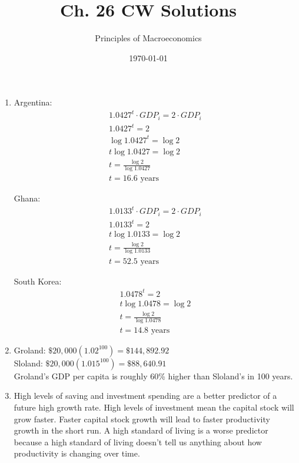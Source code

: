 \documentclass{article}
\title{Ch. 26 CW Solutions}
\author{Principles of Macroeconomics}
\date{\today}
\begin{document}
\maketitle

\begin{enumerate}

\item Argentina:
	\begin{gather*}
	1.0427^t \cdot GDP_i = 2 \cdot GDP_i \\
	1.0427^t = 2 \\
	\log{1.0427^t} = \log{2} \\
	t\log{1.0427} = \log{2} \\
	t = \frac{\log{2}}{\log{1.0427}} \\
	t = 16.6 \text{ years}
	\end{gather*}
	
	Ghana:
	\begin{gather*}
	1.0133^t \cdot GDP_i = 2 \cdot GDP_i \\
	1.0133^t = 2 \\
	t \log{1.0133} = \log{2} \\
	t = \frac{\log{2}}{\log{1.0133}} \\
	t = 52.5 \text{ years}
	\end{gather*}
	
	South Korea:
	\begin{gather*}
	1.0478^t = 2 \\
	t \log{1.0478} = \log{2} \\
	t = \frac{\log{2}}{\log{1.0478}} \\
	t = 14.8 \text{ years}
	\end{gather*}
	
\item Groland: $ \$20,000 (1.02^100) = \$144,892.92 $ \\
	Sloland: $ \$20,000 (1.015^100) = \$88,640.91 $ \\
	Groland's GDP per capita is roughly 60\% higher than Sloland's in 100 years.
	
\item High levels of saving and investment spending are a better predictor of a future high growth rate. High levels of investment mean the capital stock will grow faster. Faster capital stock growth will lead to faster productivity growth in the short run. A high standard of living is a worse predictor because a high standard of living doesn't tell us anything about how productivity is changing over time.


\end{enumerate}
\end{document}
